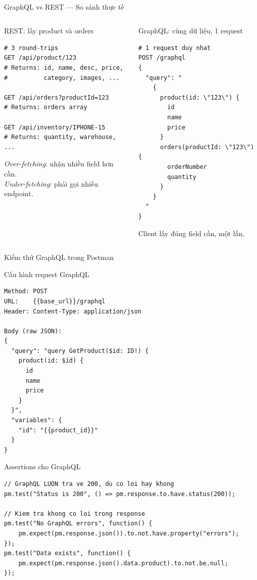 \documentclass[aspectratio=169,10pt]{beamer}
\newcommand{\sref}[1]{\textsuperscript{\scriptsize\cite{#1}}}
\begin{document}
\begin{frame}[fragile]{GraphQL vs REST --- So sánh thực tế\sref{graphql}}
  \begin{columns}
    \begin{block}{REST: lấy product và orders}
\begin{lstlisting}[style=bash]
# 3 round-trips
GET /api/product/123
# Returns: id, name, desc, price,
#          category, images, ...

GET /api/orders?productId=123
# Returns: orders array

GET /api/inventory/IPHONE-15
# Returns: quantity, warehouse, ...
\end{lstlisting}
      \textit{Over-fetching}: nhận nhiều field hơn cần.\\
      \textit{Under-fetching}: phải gọi nhiều endpoint.
    \end{block}

    \begin{block}{GraphQL: cùng dữ liệu, 1 request}
\begin{lstlisting}[style=bash]
# 1 request duy nhat
POST /graphql
{
  "query": "
    {
      product(id: \"123\") {
        id
        name
        price
      }
      orders(productId: \"123\") {
        orderNumber
        quantity
      }
    }
  "
}
\end{lstlisting}
      Client lấy đúng field cần, một lần.
    \end{block}
  \end{columns}
\end{frame}

\begin{frame}[fragile]{Kiểm thử GraphQL trong Postman}
  \begin{block}{Cấu hình request GraphQL}
\begin{lstlisting}[style=bash]
Method: POST
URL:    {{base_url}}/graphql
Header: Content-Type: application/json

Body (raw JSON):
{
  "query": "query GetProduct($id: ID!) {
    product(id: $id) {
      id
      name
      price
    }
  }",
  "variables": {
    "id": "{{product_id}}"
  }
}
\end{lstlisting}
  \end{block}

  \begin{block}{Assertions cho GraphQL}
\begin{lstlisting}[style=nonumber]
// GraphQL LUON tra ve 200, du co loi hay khong
pm.test("Status is 200", () => pm.response.to.have.status(200));

// Kiem tra khong co loi trong response
pm.test("No GraphQL errors", function() {
    pm.expect(pm.response.json()).to.not.have.property("errors");
});
pm.test("Data exists", function() {
    pm.expect(pm.response.json().data.product).to.not.be.null;
});
\end{lstlisting}
  \end{block}
\end{frame}
\end{document}
